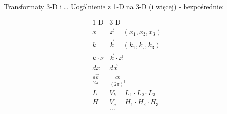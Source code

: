 \begin{frame}{Transformaty 3-D i \dots}
	Uogólnienie z 1-D na 3-D (i więcej) - bezpośrednie:
	\begin{table}[t]
		\centering
		\renewcommand{\arraystretch}{1.35}
		\[
		\tag{16.11}
		\begin{array}{c|l}
			\text{1-D} & \text{3-D} \\
			\hline
			x & \vec{x} = (x_1, x_2, x_3) \\
			k & \vec{k} = (k_1, k_2, k_3) \\
			k\cdot x & \vec{k} \cdot \vec{x} \\
			dx & d\vec{x} \\
			\frac{d\vec{k}}{2\pi} & \frac{dk}{(2\pi)^3} \\
			L & V_b = L_1 \cdot L_2 \cdot L_3 \\
			H & V_c = H_1 \cdot H_2 \cdot H_3 \\
			& \dots
		\end{array}
		\]
		\renewcommand{\arraystretch}{1}
	\end{table}
\end{frame}